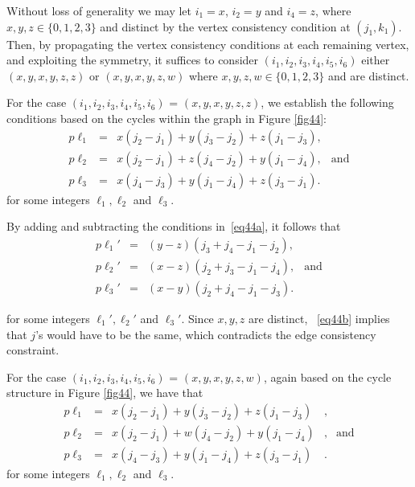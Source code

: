 Without loss of generality we may let $i_1=x$, $i_2=y$ and
$i_4=z$, where $x,y,z \in \{0,1,2,3\}$ and distinct by the vertex
consistency condition at $(j_1,k_1)$. Then, by propagating the
vertex consistency conditions at each remaining vertex, and
exploiting the symmetry, it suffices to consider
$(i_1,i_2,i_3,i_4,i_5,i_6)$ either $(x,y,x,y,z,z)$ or
$(x,y,x,y,z,w)$ where $x,y,z,w \in \{0,1,2,3 \}$ and are distinct.

For the case $(i_1,i_2,i_3,i_4,i_5,i_6)$ = $(x,y,x,y,z,z)$, we
establish the following conditions based on the cycles within the
graph in Figure \ref{fig44}:
\begin{equation}\label{eq44a}\begin{array}{ccccc}
p\ell_1&=&x(j_2-j_1)+y(j_3-j_2)+z(j_1-j_3),& \\
p\ell_2&=&x(j_2-j_1)+z(j_4-j_2)+y(j_1-j_4),&\text{and}\\
p\ell_3&=&x(j_4-j_3)+y(j_1-j_4)+z(j_3-j_1).&
\end{array}\end{equation}
for some integers $\ell_1,\ell_2$ and $\ell_3$.

By adding and subtracting the conditions in~\eqref{eq44a}, it
follows that
\begin{equation}\label{eq44b}\begin{array}{ccccc}
p\ell_1'&=&(y-z)(j_3+j_4-j_1-j_2),&\\
p\ell_2'&=&(x-z)(j_2+j_3-j_1-j_4),&\text{and}\\
p\ell_3'&=&(x-y)(j_2+j_4-j_1-j_3).&
\end{array}\end{equation}

\noindent for some integers $\ell_1',\ell_2'$ and $\ell_3'$. Since
$x,y,z$ are distinct, ~\eqref{eq44b} implies that $j$'s would have
to be the same, which contradicts the edge consistency constraint.

For the case $(i_1,i_2,i_3,i_4,i_5,i_6)$ = $(x,y,x,y,z,w)$, again
based on the cycle structure in Figure \ref{fig44}, we have that
\begin{equation}\label{eq44c}\begin{array}{ccccc}
p\ell_1&=&x(j_2-j_1)+y(j_3-j_2)+z(j_1-j_3)&,&{}\\
p\ell_2&=&x(j_2-j_1)+w(j_4-j_2)+y(j_1-j_4)&,&\text{and}\\
p\ell_3&=&x(j_4-j_3)+y(j_1-j_4)+z(j_3-j_1)&.&{}
\end{array}\end{equation}
for some integers $\ell_1,\ell_2$ and $\ell_3$.

